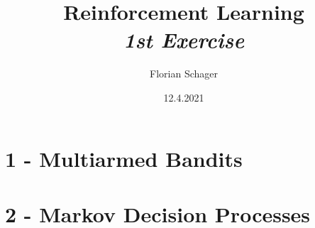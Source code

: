 \documentclass{article}
\title
{
  Reinforcement Learning \\
  \vspace{4pt}
  \normalsize
  \textit{1st Exercise}
}
\author
{
  Florian Schager
}
\date{12.4.2021}
\begin{document}
\maketitle

\section*{1 - Multiarmed Bandits}








\section*{2 - Markov Decision Processes}
















\end{document}
